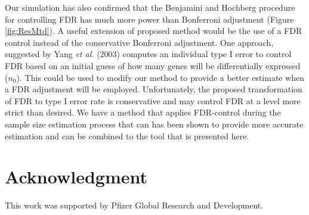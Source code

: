 \documentclass[12pt]{article}
\begin{document}
Our simulation has also confirmed that the Benjamini and Hochberg
procedure for controlling FDR has much more power than Bonferroni
adjustment (Figure \ref{fig:ResMtd}). A useful extension of
proposed method would be the use of a FDR control instead of the
conservative Bonferroni adjustment. One approach, suggested by
Yang \textit{et al.} (2003) computes an individual type I error to
control FDR based on an initial guess of how many genes will be
differentially expressed ($n_0$). This could be used to modify our
method to provide a better estimate when a FDR adjustment will be
employed.  Unfortunately, the proposed transformation of FDR to
type I error rate is conservative and may control FDR at a level
more strict than desired. We have a method that applies
FDR-control during the sample size estimation process that can has
been shown to provide more accurate estimation and can be combined
to the tool that is presented here.


\section*{Acknowledgment}

This work was supported by Pfizer Global Research and Development.
\end{document}
